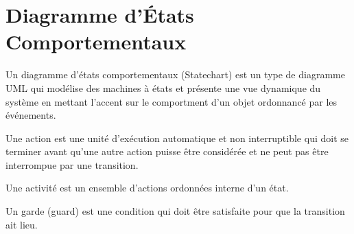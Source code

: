 \newpage
\section{Diagramme d'États Comportementaux}\label{sec:diagramme_etatscomportementaux}
\begin{definition}
Un diagramme d'états comportementaux (Statechart) est un type de diagramme UML qui modélise des machines à états et présente une vue dynamique du système en mettant l'accent sur le comportment d'un objet ordonnancé par les événements.
\end{definition}

\begin{definition}[Action]
	Une action est une unité d’exécution automatique et non interruptible qui doit se terminer avant qu’une autre action puisse être considérée et ne peut pas être interrompue par une transition.
\end{definition}

\begin{definition}[Activité]
	Une activité est un ensemble d'actions ordonnées interne d'un état.
\end{definition}

\begin{definition}[Garde]
	Un garde (guard) est une condition qui doit être satisfaite pour que la transition ait lieu.
\end{definition}


